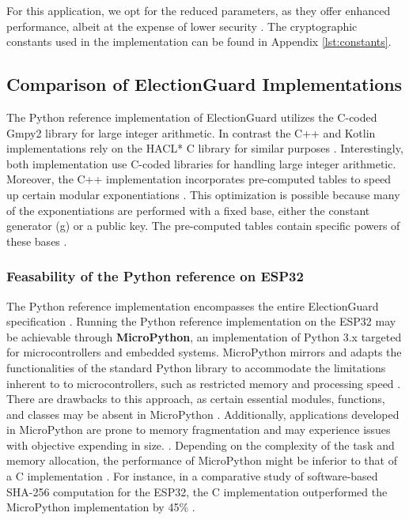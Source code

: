 For this application, we opt for the reduced parameters, as they offer enhanced performance, albeit at the expense of lower security \cite[36-37]{eg-spec}. The cryptographic constants used in the implementation can be found in Appendix \ref{lst:constants}.



\subsection{Comparison of ElectionGuard Implementations}
The Python reference implementation of ElectionGuard utilizes the C-coded Gmpy2 library for large integer arithmetic. In contrast the C++ and Kotlin implementations rely on the HACL* C library for similar purposes \cite{eg-docs}. Interestingly, both implementation use C-coded libraries for handling large integer arithmetic. Moreover, the C++ implementation incorporates pre-computed tables to speed up certain modular exponentiations \cite{eg-docs}. This optimization is possible because many of the exponentiations are performed with a fixed base, either the constant generator (g) or a public key. The pre-computed tables contain specific powers of these bases \cite{eg-docs}.

\subsubsection{Feasability of the Python reference on ESP32}
The Python reference implementation encompasses the entire ElectionGuard specification \cite{python-reference}. Running the Python reference implementation on the ESP32 may be achievable through \textbf{MicroPython}, an implementation of Python 3.x targeted for microcontrollers and embedded systems. MicroPython mirrors and adapts the functionalities of the standard Python library to accommodate the limitations inherent to to microcontrollers, such as restricted memory and processing speed \cite{micropython} \cite[234]{micropython-performance}. There are drawbacks to this approach, as certain essential modules, functions, and classes may be absent in MicroPython \cite{micropython}. Additionally, applications developed in MicroPython are prone to memory fragmentation and may experience issues with objective expending in size. \cite[234]{micropython-performance}. Depending on the complexity of the task and memory allocation, the performance of MicroPython might be inferior to that of a C implementation \cite[237]{micropython-performance}. For instance, in a comparative study of software-based SHA-256 computation for the ESP32, the C implementation outperformed the MicroPython implementation by 45\% \cite[237]{micropython-performance}.

